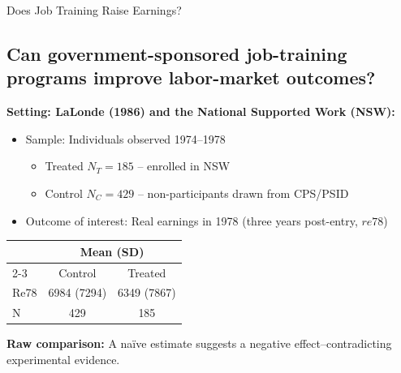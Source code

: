 \documentclass[11pt,aspectratio=169]{beamer}
\begin{document}
\begin{frame}{Does Job Training Raise Earnings?}

\subsection*{Can government-sponsored job-training programs improve labor-market outcomes?}

\textbf{Setting: LaLonde (1986) and the National Supported Work (NSW):}
\begin{itemize}
    \item Sample: Individuals observed 1974–1978
    \begin{itemize}
        \item[$\blacksquare$] Treated $N_T = 185$ -- enrolled in NSW
        \item[$\blacksquare$] Control $N_C = 429$ -- non-participants drawn from CPS/PSID
    \end{itemize}
    \item Outcome of interest: Real earnings in 1978 (three years post-entry, $re78$)
\end{itemize}

\begin{center}
\begin{tabular}{lcc}
\hline
& \multicolumn{2}{c}{\textbf{Mean (SD)}} \\
\cline{2-3}
& Control & Treated \\
\hline
Re78 & 6984 (7294) & 6349 (7867) \\
N & 429 & 185 \\
\hline
\end{tabular}
\end{center}

\textbf{Raw comparison:} A naïve estimate suggests a negative effect--contradicting experimental evidence.

\end{frame}
\end{document}
